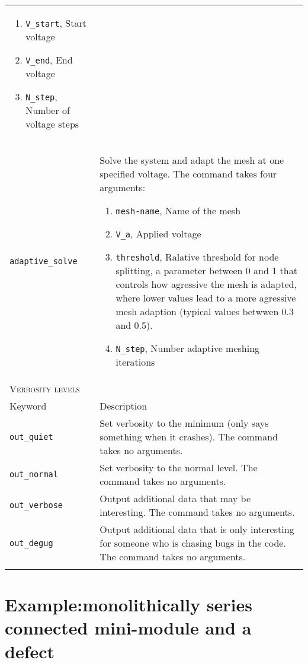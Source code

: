 \documentclass[noshowpacs,preprintnumbers,amsmath,amssymb, letter]{revtex4}
\begin{document}
\begin{longtable}{p{}p{}}
\begin{enumerate}
\item \texttt{V\_start}, Start voltage
\item \texttt{V\_end}, End voltage
\item \texttt{N\_step}, Number of voltage steps
\end{enumerate}\\
\texttt{adaptive\_solve}	&  Solve the system and adapt the mesh at one specified voltage. The command takes four arguments:
\begin{enumerate}
\item \texttt{mesh-name}, Name of the mesh
\item \texttt{V\_a}, Applied voltage
\item \texttt{threshold}, Ralative threshold for node splitting, a parameter between 0 and 1 that controls how agressive the mesh is adapted, where lower values lead to a more agressive mesh adaption (typical values betwwen 0.3 and 0.5).
\item \texttt{N\_step}, Number adaptive meshing iterations
\end{enumerate}\\
\multicolumn{2}{l}{\textsc{Verbosity levels}} \\*
\hline
Keyword & Description \\
\texttt{out\_quiet}	&  Set verbosity to the minimum (only says something when it crashes). The command takes no arguments.\\
\texttt{out\_normal}	&  Set verbosity to the normal level. The command takes no arguments.\\
\texttt{out\_verbose}	&  Output additional data that may be interesting. The command takes no arguments.\\
\texttt{out\_degug}	&  Output additional data that is only interesting for someone who is chasing bugs in the code. The command takes no arguments.\\
\hline
\\
\end{longtable}

\section{Example:monolithically series connected mini-module and a defect}
\end{document}
